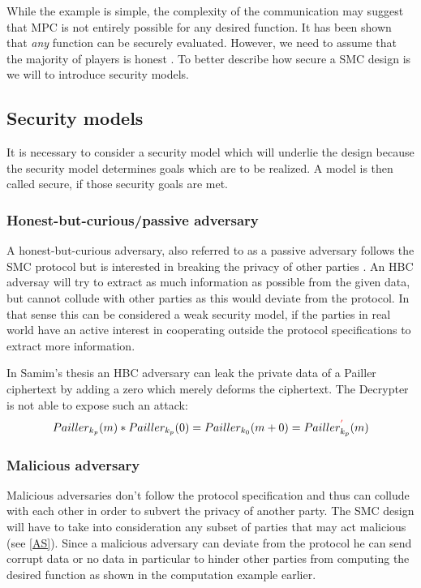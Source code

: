 \documentclass[12pt,a4paper]{scrartcl}				%
\begin{document}
While the example is simple, the complexity of the communication may suggest that MPC is not entirely possible for any desired function. It has been shown that \textit{any} function can be securely evaluated. However, we need to assume that the majority of players is honest \cite{goldreich1987play}. To better describe how secure a SMC design is we will to introduce security models.

\subsection{Security models}
\label{sec:Security_models}

It is necessary to consider a security model which will underlie the design because the security model determines goals which are to be realized. A model is then called secure, if those security goals are met.  

\subsubsection{Honest-but-curious/passive adversary}
A honest-but-curious adversary, also referred to as a passive adversary follows the SMC protocol but is interested in breaking the privacy of other parties \cite{cramer2009}. An HBC adversay will try to extract as much information as possible from the given data, but cannot collude with other parties as this would deviate from the protocol. In that sense this can be considered a weak security model, if the parties in real world have an active interest in cooperating outside the protocol specifications to extract more information.

In Samim's thesis \cite{BASamim} an HBC adversary can leak the private data of a Pailler ciphertext by adding a zero which merely deforms the ciphertext. The Decrypter is not able to expose such an attack:
\begin{equation*}
Pailler_{k_p}(m)\ast Pailler_{k_p}(0)=Pailler_{k_0}(m+0)=Pailler^{\textcolor{red}{'}}_{k_p}(m)
\end{equation*}

\subsubsection{Malicious adversary}
Malicious adversaries don't follow the protocol specification and thus can collude with each other in order to subvert the privacy of another party.\cite{cramer2009} The SMC design will have to take into consideration any subset of parties that may act malicious (see \ref{AS}). Since a malicious adversary can deviate from the protocol he can send corrupt data or no data in particular to hinder other parties from computing the desired function as shown in the computation example earlier.
\end{document}
